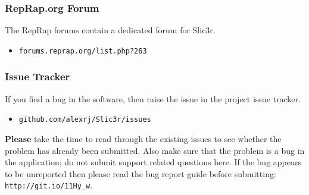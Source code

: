 \subsubsection{RepRap.org Forum} %
\label{sub:reprap_org_forum}


The RepRap forums contain a dedicated forum for Slic3r.
\begin{itemize}
    \item \texttt{forums.reprap.org/list.php?263}
\end{itemize}


\subsubsection{Issue Tracker} %
\label{sub:issue_tracker}

If you find a bug in the software, then raise the issue in the project issue tracker.

\begin{itemize}
    \item \texttt{github.com/alexrj/Slic3r/issues}
\end{itemize}

\textbf{Please} take the time to read through the existing issues to see whether the problem has already been submitted.  Also make sure that the problem is a bug in the application; do not submit support related questions here.
If the bug appears to be unreported then please read the bug report guide before submitting: \texttt{http://git.io/11Hy\_w}.

